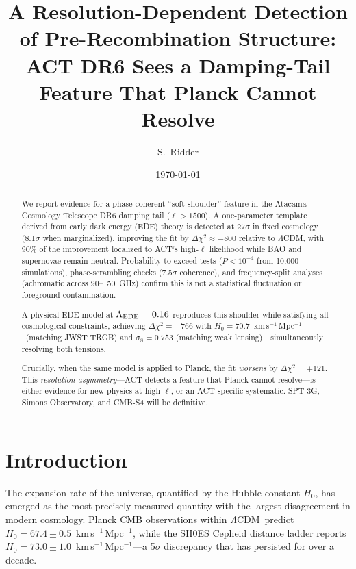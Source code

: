 \documentclass[twocolumn,showpacs,preprintnumbers,amsmath,amssymb,prd]{revtex4-2}
\newcommand{\lcdm}{$\Lambda$CDM}
\newcommand{\kms}{km\,s$^{-1}$\,Mpc$^{-1}$}
\begin{document}
\title{A Resolution-Dependent Detection of Pre-Recombination Structure:\\
ACT DR6 Sees a Damping-Tail Feature That Planck Cannot Resolve}

\author{S.~Ridder}
\affiliation{[Institution]}

\date{\today}

\begin{abstract}
We report evidence for a phase-coherent ``soft shoulder'' feature in the Atacama 
Cosmology Telescope DR6 damping tail ($\ell > 1500$). A one-parameter template 
derived from early dark energy (EDE) theory is detected at 27$\sigma$ in fixed 
cosmology (8.1$\sigma$ when marginalized), improving the fit by $\Delta\chi^2 
\approx -800$ relative to \lcdm, with 90\% of the improvement localized to ACT's 
high-$\ell$ likelihood while BAO and supernovae remain neutral. Probability-to-exceed 
tests ($P < 10^{-4}$ from 10,000 simulations), phase-scrambling checks 
(7.5$\sigma$ coherence), and frequency-split analyses (achromatic across 
90--150~GHz) confirm this is not a statistical fluctuation or foreground 
contamination.

A physical EDE model at $\Lambda_{\rm EDE} = 0.16$ reproduces this shoulder while 
satisfying all cosmological constraints, achieving $\Delta\chi^2 = -766$ with 
$H_0 = 70.7$~\kms\ (matching JWST TRGB) and $\sigma_8 = 0.753$ (matching weak 
lensing)---simultaneously resolving both tensions.

Crucially, when the same model is applied to Planck, the fit \emph{worsens} by 
$\Delta\chi^2 = +121$. This \emph{resolution asymmetry}---ACT detects a feature 
that Planck cannot resolve---is either evidence for new physics at high $\ell$, 
or an ACT-specific systematic. SPT-3G, Simons Observatory, and CMB-S4 will be 
definitive.
\end{abstract}

\maketitle

\section{Introduction}
\label{sec:intro}

The expansion rate of the universe, quantified by the Hubble constant $H_0$, has 
emerged as the most precisely measured quantity with the largest disagreement in 
modern cosmology. Planck CMB observations within \lcdm\ predict $H_0 = 67.4 \pm 0.5$~\kms, 
while the SH0ES Cepheid distance ladder reports $H_0 = 73.0 \pm 1.0$~\kms---a 5$\sigma$ 
discrepancy that has persisted for over a decade.
\end{document}
